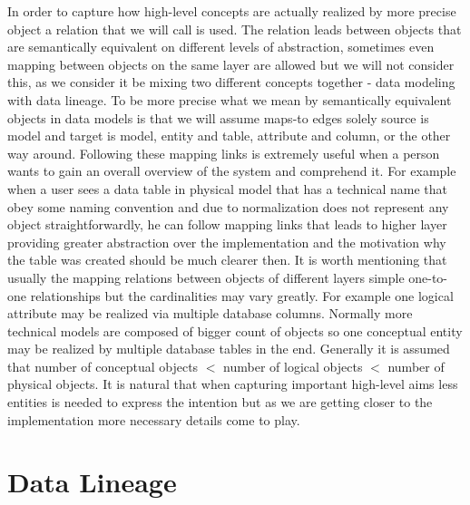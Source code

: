 In order to capture how high-level concepts are actually realized by more precise object a relation that we will call  is used. The relation leads between objects that are semantically equivalent on different levels of abstraction, sometimes even mapping between objects on the same layer are allowed but we will not consider this, as we consider it be mixing two different concepts together - data modeling with data lineage. To be more precise what we mean by semantically equivalent objects in data models is that we will assume maps-to edges solely source is model and target is model, entity and table, attribute and column, or the other way around.
Following these mapping links is extremely useful when a person wants to gain an overall overview of the system and comprehend it. For example when a user sees a data table in physical model that has a technical name that obey some naming convention and due to normalization does not represent any object straightforwardly, he can follow mapping links that leads to higher layer providing greater  abstraction over the implementation and the motivation why the table was created should be much clearer then.
It is worth mentioning that usually the mapping relations between objects of different layers simple one-to-one relationships but the cardinalities may vary greatly. For example one logical attribute may be realized via multiple database columns.
Normally more technical models are composed of bigger count of objects so one conceptual entity may be realized by multiple database tables in the end. Generally it is assumed that number of conceptual objects $<$ number of logical objects $<$ number of physical objects. It is natural that when capturing important high-level aims less entities is needed to express the intention but as we are getting closer to the implementation more necessary details come to play.

\section{Data Lineage}

